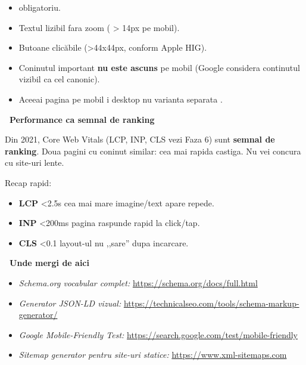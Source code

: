 \begin{bonusbox}
\begin{itemize}[itemsep=1pt]
  \item {} \textendash{} obligatoriu.
  \item Textul lizibil fara zoom ( \textgreater{} 14px pe mobil).
  \item Butoane clic\u abile (\textgreater 44x44px, conform Apple HIG).
  \item Coninutul important \textbf{nu este ascuns} pe mobil (Google considera continutul vizibil ca cel canonic).
  \item Aceeai pagina pe mobil i desktop \textendash{} nu varianta separata .
\end{itemize}

\medskip

\textbf{\faChartBar\ Performance ca semnal de ranking}

Din 2021, Core Web Vitals (LCP, INP, CLS \textendash{} vezi Faza 6) sunt \textbf{semnal de ranking}. Doua pagini cu coninut similar: cea mai rapida castiga. Nu vei concura cu site-uri lente.

Recap rapid:
\begin{itemize}[itemsep=1pt]
  \item \textbf{LCP} \textless 2.5s \textendash{} cea mai mare imagine/text apare repede.
  \item \textbf{INP} \textless 200ms \textendash{} pagina raspunde rapid la click/tap.
  \item \textbf{CLS} \textless 0.1 \textendash{} layout-ul nu ,,sare'' dupa incarcare.
\end{itemize}

\medskip

\textbf{\faRoute\ Unde mergi de aici}

\begin{itemize}[itemsep=1pt]
  \item \emph{Schema.org vocabular complet:} \url{https://schema.org/docs/full.html}
  \item \emph{Generator JSON-LD vizual:} \url{https://technicalseo.com/tools/schema-markup-generator/}
  \item \emph{Google Mobile-Friendly Test:} \url{https://search.google.com/test/mobile-friendly}
  \item \emph{Sitemap generator pentru site-uri statice:} \url{https://www.xml-sitemaps.com}
\end{itemize}
\end{bonusbox}

